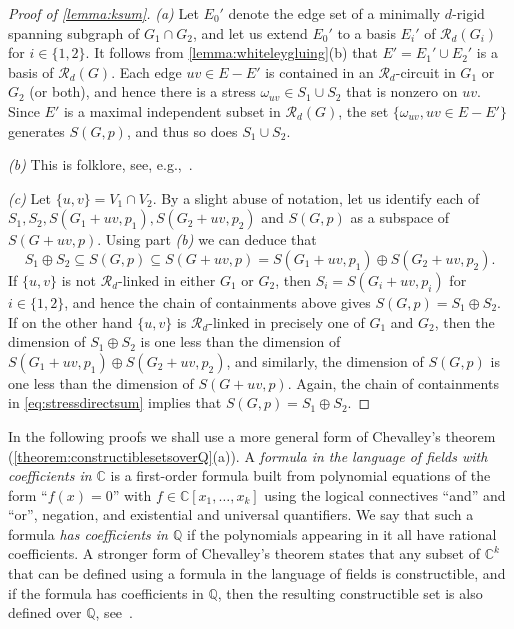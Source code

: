 \documentclass[11pt,a4paper,dvipsnames]{scrartcl}
\theoremstyle{definition}
\newcommand{\CC}{\mathbb{C}}
\newcommand{\QQ}{\mathbb{Q}}
\newcommand{\rig}[1]{$#1$-rigid}
\begin{document}
\begin{proof}[Proof of \cref{lemma:ksum}]
    \textit{(a)} Let $E_0'$ denote the edge set of a minimally \rig{d} spanning subgraph of $G_1 \cap G_2$, and let us extend $E_0'$ to a basis $E_i'$ of $\mathcal{R}_d(G_i)$ for $i \in \{1,2\}$. It follows from \cref{lemma:whiteleygluing}(b) %
    that $E' = E_1' \cup E_2'$ is a basis of $\mathcal{R}_d(G)$. Each edge $uv \in E - E'$ is contained in an $\mathcal{R}_d$-circuit in $G_1$ or $G_2$ (or both), and hence there is a stress $\omega_{uv} \in S_1 \cup S_2$ that is nonzero on $uv$. Since $E'$ is a maximal independent subset in $\mathcal{R}_d(G)$, the set $\{\omega_{uv}, uv \in E - E'\}$ generates $S(G,p)$, and thus so does $S_1 \cup S_2$.
    
    \textit{(b)}
    This is folklore, see, e.g.,~\cite[Lemma 6.3]{bernstein.etal_2021}.

    \textit{(c)} Let $\{u,v\} = V_1 \cap V_2$. By a slight abuse of notation, let us identify each of $S_1,S_2,S(G_1+uv,p_1),S(G_2+uv,p_2)$ and $S(G,p)$ as a subspace of $S(G+uv,p)$. Using part \emph{(b)} we can deduce that  
    \begin{equation}\label{eq:stressdirectsum}
        S_1 \oplus S_2 \subseteq S(G,p) \subseteq S(G+uv,p) = S(G_1+uv,p_1) \oplus S(G_2+uv,p_2). 
    \end{equation}
    If $\{u,v\}$ is not $\mathcal{R}_d$-linked in either $G_1$ or $G_2$, then $S_i = S(G_i+uv,p_i)$ for $i \in \{1,2\}$, and hence the chain of containments above gives $S(G,p) = S_1 \oplus S_2$. If on the other hand $\{u,v\}$ is $\mathcal{R}_d$-linked in precisely one of $G_1$ and $G_2$, then the dimension of $S_1 \oplus S_2$ is one less than the dimension of $S(G_1+uv,p_1) \oplus S(G_2+uv,p_2)$, and similarly, the dimension of $S(G,p)$ is one less than the dimension of $S(G+uv,p)$. Again, the chain of containments in \cref{eq:stressdirectsum} implies that $S(G,p) = S_1 \oplus S_2$.
\end{proof}


In the following proofs we shall use a more general form of Chevalley's theorem (\cref{theorem:constructiblesetsoverQ}(a)). A \emph{formula in the language of fields with coefficients in $\CC$} is a first-order formula built from polynomial equations of the form ``$f(x) = 0$'' with $f \in \CC[x_1,\ldots,x_k]$ using the logical connectives ``and'' and ``or'', negation, and existential and universal quantifiers. We say that such a formula \emph{has coefficients in $\QQ$} if the polynomials appearing in it all have rational coefficients. A stronger form of Chevalley's theorem states that any subset of $\CC^k$ that can be defined using a formula in the language of fields is constructible, and if the formula has coefficients in $\QQ$, then the resulting constructible set is also defined over $\QQ$, see~\cite[Corollary 1.24]{basu.etal_2006}. 
\end{document}
